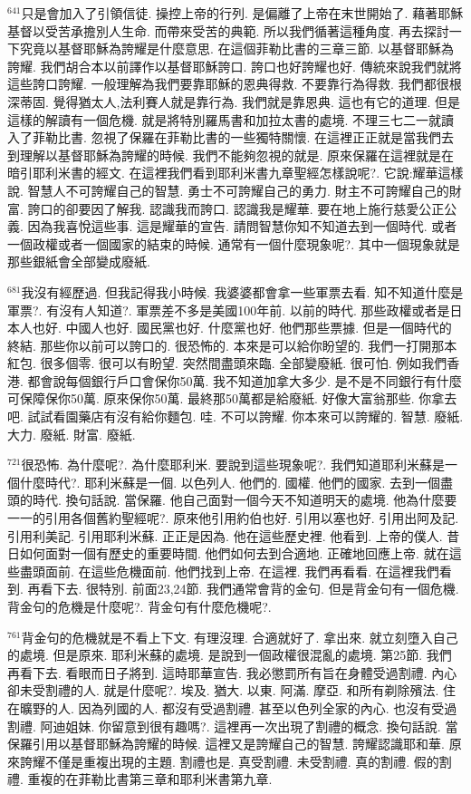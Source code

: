 \documentclass{book}
\begin{document}
$^{641}$只是會加入了引領信徒.
操控上帝的行列.
是偏離了上帝在末世開始了.
藉著耶穌基督以受苦承擔別人生命.
而帶來受苦的典範.
所以我們循著這種角度.
再去探討一下究竟以基督耶穌為誇耀是什麼意思.
在這個菲勒比書的三章三節.
以基督耶穌為誇耀.
我們胡合本以前譯作以基督耶穌誇口.
誇口也好誇耀也好.
傳統來說我們就將這些誇口誇耀.
一般理解為我們要靠耶穌的恩典得救.
不要靠行為得救.
我們都很根深蒂固.
覺得猶太人,法利賽人就是靠行為.
我們就是靠恩典.
這也有它的道理.
但是這樣的解讀有一個危機.
就是將特別羅馬書和加拉太書的處境.
不理三七二一就讀入了菲勒比書.
忽視了保羅在菲勒比書的一些獨特關懷.
在這裡正正就是當我們去到理解以基督耶穌為誇耀的時候.
我們不能夠忽視的就是.
原來保羅在這裡就是在暗引耶利米書的經文.
在這裡我們看到耶利米書九章聖經怎樣說呢?.
它說:耀華這樣說.
智慧人不可誇耀自己的智慧.
勇士不可誇耀自己的勇力.
財主不可誇耀自己的財富.
誇口的卻要因了解我.
認識我而誇口.
認識我是耀華.
要在地上施行慈愛公正公義.
因為我喜悅這些事.
這是耀華的宣告.
請問智慧你知不知道去到一個時代.
或者一個政權或者一個國家的結束的時候.
通常有一個什麼現象呢?.
其中一個現象就是那些銀紙會全部變成廢紙.

$^{681}$我沒有經歷過.
但我記得我小時候.
我婆婆都會拿一些軍票去看.
知不知道什麼是軍票?.
有沒有人知道?.
軍票差不多是美國100年前.
以前的時代.
那些政權或者是日本人也好.
中國人也好.
國民黨也好.
什麼黨也好.
他們那些票據.
但是一個時代的終結.
那些你以前可以誇口的.
很恐怖的.
本來是可以給你盼望的.
我們一打開那本紅包.
很多個零.
很可以有盼望.
突然間盡頭來臨.
全部變廢紙.
很可怕.
例如我們香港.
都會說每個銀行戶口會保你50萬.
我不知道加拿大多少.
是不是不同銀行有什麼可保障保你50萬.
原來保你50萬.
最終那50萬都是給廢紙.
好像大富翁那些.
你拿去吧.
試試看園藥店有沒有給你麵包.
哇.
不可以誇耀.
你本來可以誇耀的.
智慧.
廢紙.
大力.
廢紙.
財富.
廢紙.

$^{721}$很恐怖.
為什麼呢?.
為什麼耶利米.
要說到這些現象呢?.
我們知道耶利米蘇是一個什麼時代?.
耶利米蘇是一個.
以色列人.
他們的.
國權.
他們的國家.
去到一個盡頭的時代.
換句話說.
當保羅.
他自己面對一個今天不知道明天的處境.
他為什麼要一一的引用各個舊約聖經呢?.
原來他引用約伯也好.
引用以塞也好.
引用出阿及記.
引用利美記.
引用耶利米蘇.
正正是因為.
他在這些歷史裡.
他看到.
上帝的僕人.
昔日如何面對一個有歷史的重要時間.
他們如何去到合適地.
正確地回應上帝.
就在這些盡頭面前.
在這些危機面前.
他們找到上帝.
在這裡.
我們再看看.
在這裡我們看到.
再看下去.
很特別.
前面23,24節.
我們通常會背的金句.
但是背金句有一個危機.
背金句的危機是什麼呢?.
背金句有什麼危機呢?.

$^{761}$背金句的危機就是不看上下文.
有理沒理.
合適就好了.
拿出來.
就立刻墮入自己的處境.
但是原來.
耶利米蘇的處境.
是說到一個政權很混亂的處境.
第25節.
我們再看下去.
看眼而日子將到.
這時耶華宣告.
我必懲罰所有旨在身體受過割禮.
內心卻未受割禮的人.
就是什麼呢?.
埃及.
猶大.
以東.
阿滿.
摩亞.
和所有剃除殯法.
住在曠野的人.
因為列國的人.
都沒有受過割禮.
甚至以色列全家的內心.
也沒有受過割禮.
阿迪姐妹.
你留意到很有趣嗎?.
這裡再一次出現了割禮的概念.
換句話說.
當保羅引用以基督耶穌為誇耀的時候.
這裡又是誇耀自己的智慧.
誇耀認識耶和華.
原來誇耀不僅是重複出現的主題.
割禮也是.
真受割禮.
未受割禮.
真的割禮.
假的割禮.
重複的在菲勒比書第三章和耶利米書第九章.
\end{document}
